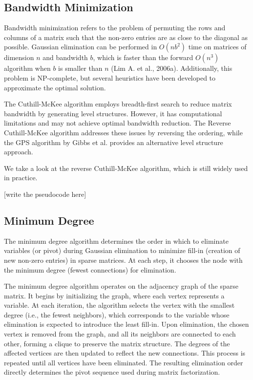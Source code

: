 \subsection{Bandwidth Minimization}

Bandwidth minimization refers to the problem of permuting the rows and columns of a matrix such that the non-zero entries are as close to the diagonal as possible.  Gaussian elimination can be performed in $O(nb^2)$ time on matrices of dimension $n$ and bandwidth $b$, which is faster than the forward $O(n^3)$ algorithm when $b$ is smaller than $n$ (Lim A. et al., 2006a).  Additionally, this problem is NP-complete, but several heuristics have been developed to approximate the optimal solution.

The Cuthill-McKee algorithm employs breadth-first search to reduce matrix bandwidth by generating level structures. However, it has computational limitations and may not achieve optimal bandwidth reduction. The Reverse Cuthill-McKee algorithm addresses these issues by reversing the ordering, while the GPS algorithm by Gibbs et al. provides an alternative level structure approach.

We take a look at the reverse Cuthill-McKee algorithm, which is still widely used in practice. 

[write the pseudocode here]

\subsection{Minimum Degree}

The minimum degree algorithm determines the order in which to eliminate variables (or pivot) during Gaussian elimination to minimize fill-in (creation of new non-zero entries) in sparse matrices. At each step, it chooses the node with the minimum degree (fewest connections) for elimination.

The minimum degree algorithm operates on the adjacency graph of the sparse matrix. It begins by initializing the graph, where each vertex represents a variable. At each iteration, the algorithm selects the vertex with the smallest degree (i.e., the fewest neighbors), which corresponds to the variable whose elimination is expected to introduce the least fill-in. Upon elimination, the chosen vertex is removed from the graph, and all its neighbors are connected to each other, forming a clique to preserve the matrix structure. The degrees of the affected vertices are then updated to reflect the new connections. This process is repeated until all vertices have been eliminated. The resulting elimination order directly determines the pivot sequence used during matrix factorization.

